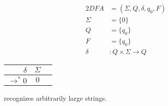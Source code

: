 \documentclass[docid=TP03]{tcom_TP}
\begin{document}
{\begin{center}
\end{center}
\begin{center}
\begin{minipage}[c]{0.25\textwidth}
	\begin{alignat*}{2}
		DFA    &= (\Sigma, Q, \delta, q_0, F)\\
		\Sigma &= \{0\}\\
		Q      &= \{q_0\}\\
		F      &= \{q_0\}\\
		\delta &\colon Q \times \Sigma \rightarrow Q
	\end{alignat*}
\end{minipage}%
\begin{minipage}[c]{0.2\textwidth}
	\begin{center}
	\begin{tabular}{ r | c c }
 		$\delta            $ & $\Sigma$ \\ \hline
 		$\rightarrow^* 0$ & $0     $ \\  
	\end{tabular}
	\end{center}
\end{minipage}
\end{center}
recognizes arbitrarily large strings.

}
\end{document}
